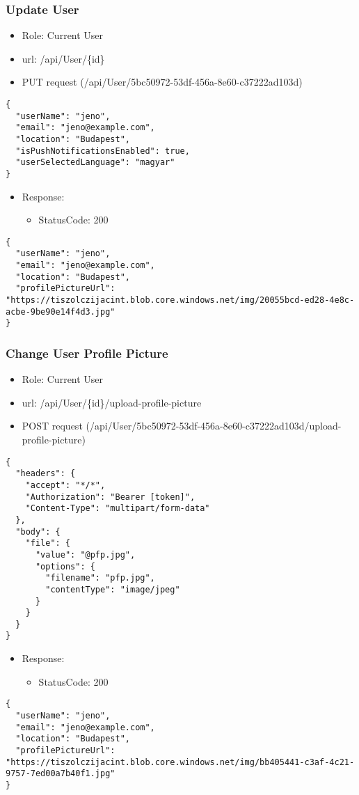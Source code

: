 \documentclass[11pt]{article}
\begin{document}
\subsubsection{Update User}
\label{sec:org606cd06}
\begin{itemize}
\item Role: Current User
\item url: /api/User/\{id\}
\item PUT request (/api/User/5bc50972-53df-456a-8e60-c37222ad103d)
\end{itemize}
\begin{verbatim}
{
  "userName": "jeno",
  "email": "jeno@example.com",
  "location": "Budapest",
  "isPushNotificationsEnabled": true,
  "userSelectedLanguage": "magyar"
}
\end{verbatim}
\begin{itemize}
\item Response:
\begin{itemize}
\item StatusCode: 200
\end{itemize}
\end{itemize}
\begin{verbatim}
{
  "userName": "jeno",
  "email": "jeno@example.com",
  "location": "Budapest",
  "profilePictureUrl": "https://tiszolczijacint.blob.core.windows.net/img/20055bcd-ed28-4e8c-acbe-9be90e14f4d3.jpg"
}
\end{verbatim}
\subsubsection{Change User Profile Picture}
\label{sec:orgd948ea8}
\begin{itemize}
\item Role: Current User
\item url: /api/User/\{id\}/upload-profile-picture
\item POST request (/api/User/5bc50972-53df-456a-8e60-c37222ad103d/upload-profile-picture)
\end{itemize}
\begin{verbatim}
{
  "headers": {
    "accept": "*/*",
    "Authorization": "Bearer [token]",
    "Content-Type": "multipart/form-data"
  },
  "body": {
    "file": {
      "value": "@pfp.jpg",
      "options": {
        "filename": "pfp.jpg",
        "contentType": "image/jpeg"
      }
    }
  }
}
\end{verbatim}
\begin{itemize}
\item Response:
\begin{itemize}
\item StatusCode: 200
\end{itemize}
\end{itemize}
\begin{verbatim}
{
  "userName": "jeno",
  "email": "jeno@example.com",
  "location": "Budapest",
  "profilePictureUrl": "https://tiszolczijacint.blob.core.windows.net/img/bb405441-c3af-4c21-9757-7ed00a7b40f1.jpg"
}
\end{verbatim}
\end{document}
